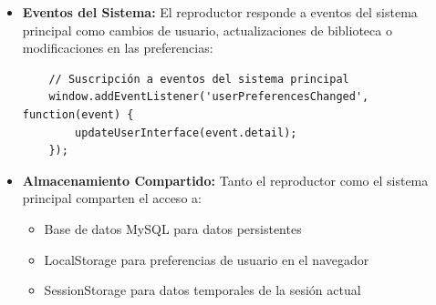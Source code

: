 \documentclass[a4paper,12pt]{article}
\begin{document}
\begin{itemize}
\begin{verbatim}
\subsection{Arquitectura de Integración}
El Reproductor Inteligente se integra con el sistema principal a través de una arquitectura cliente-servidor donde:

\begin{itemize}
    \item \textbf{Frontend (Cliente):} Implementado en HTML, CSS y JavaScript puro, se encarga de la interfaz de usuario y la lógica de interacción.
    
    \item \textbf{Backend (Servidor):} Desarrollado en PHP, gestiona el acceso a la base de datos MySQL y proporciona endpoints para que el frontend pueda obtener y manipular datos.
    
    \item \textbf{Base de Datos:} Almacena toda la información relacionada con canciones, usuarios y preferencias.
\end{itemize}

\subsection{Puntos de Integracion}
Los principales puntos de integración entre componentes son:

\begin{itemize}
    \item \textbf{API REST:} El frontend se comunica con el backend a través de llamadas AJAX a endpoints PHP:
    \begin{verbatim}
    // Ejemplo de llamada desde el frontend
    fetch('get_songs.php')
        .then(response => response.json())
        .then(data => {
            // Procesar datos recibidos
        });
    \end{verbatim}
    
    \item \textbf{Eventos del Sistema:} El reproductor responde a eventos del sistema principal como cambios de usuario, actualizaciones de biblioteca o modificaciones en las preferencias:
    \begin{verbatim}
    // Suscripción a eventos del sistema principal
    window.addEventListener('userPreferencesChanged', function(event) {
        updateUserInterface(event.detail);
    });
    \end{verbatim}
    
    \item \textbf{Almacenamiento Compartido:} Tanto el reproductor como el sistema principal comparten el acceso a:
    \begin{itemize}
        \item Base de datos MySQL para datos persistentes
        \item LocalStorage para preferencias de usuario en el navegador
        \item SessionStorage para datos temporales de la sesión actual
    \end{itemize}
\end{itemize}
\end{document}
